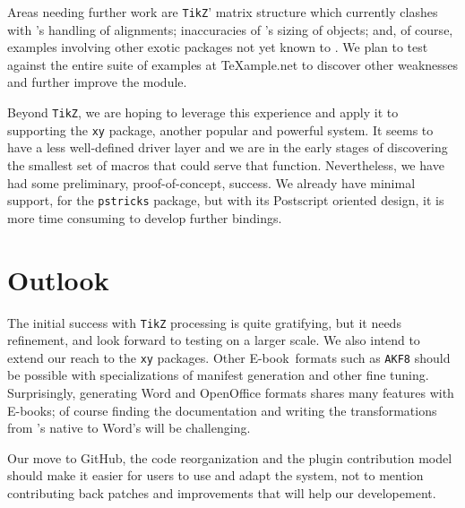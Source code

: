 \documentclass{llncs}
\def\ebook{\mbox{E-book}\xspace}
\def\tikz{\texttt{TikZ}\xspace}
\begin{document}
Areas needing further work are \tikz' matrix
structure which currently clashes with \LaTeXML's handling
of alignments; inaccuracies of \LaTeXML's sizing of objects;
and, of course, examples involving other exotic packages
not yet known to \LaTeXML.  We plan to test against
the entire suite of examples at {\TeX}ample.net to discover
other weaknesses and further improve the module.

Beyond \tikz, we are hoping to leverage this experience and apply
it to supporting the \texttt{xy} package, another
popular and powerful system.  It seems to have a less
well-defined driver layer and we are in the early stages of
discovering the smallest set of macros that could serve that
function. Nevertheless, we have had some preliminary, proof-of-concept, success.
We already have minimal support, for the \texttt{pstricks}
package, but with its Postscript oriented design,
it is more time consuming to develop further bindings.

\section{Outlook}
The initial success with \tikz processing is quite
gratifying, but it needs refinement, and look forward to testing
on a larger scale. We also intend
to extend our reach to the \texttt{xy} packages.
Other \ebook\ formats such as \texttt{AKF8} should be possible with
specializations of manifest generation and other fine tuning.
Surprisingly, generating Word and OpenOffice formats shares many features
with {\ebook}s; of course finding the documentation and writing the {\XSLT}
transformations from \LaTeXML's native {\XML} to Word's will be challenging.

Our move to GitHub, the code reorganization and the plugin contribution model should make it easier
for users to use and adapt the system, not to mention contributing
back patches and improvements that will help our developement.

\printbibliography
\end{document}
